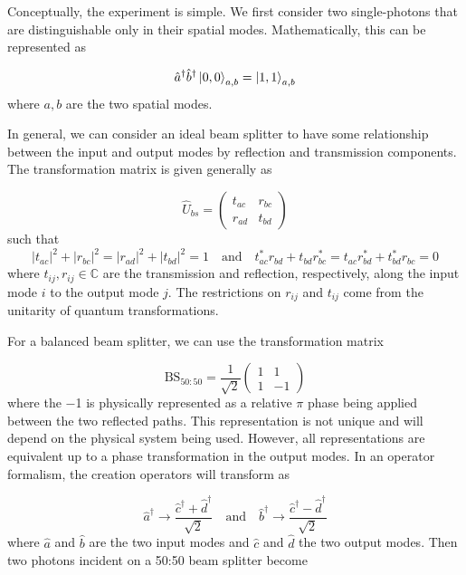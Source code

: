 Conceptually, the experiment is simple. We first consider two single-photons that are distinguishable only in their spatial modes. Mathematically, this can be represented as 

\begin{equation}
	\hat{a}^\dagger \hat{b}^\dagger \ket{0,0}_{a,b} = \ket{1,1}_{a,b}
\end{equation}
where $a,b$ are the two spatial modes.

In general, we can consider an ideal beam splitter to have some relationship between the input and output modes by reflection and transmission components. The transformation matrix is given generally as 

\begin{equation}
	\hat{U}_{bs} = \left(
	\begin{matrix}
		t_{ac} & r_{bc} \\
		r_{ad} & t_{bd}
	\end{matrix}
	\right)
\end{equation}
such that
\begin{equation}
	|t_{ac}|^2 + |r_{bc}|^2 = |r_{ad}|^2 + |t_{bd}|^2 = 1 
	\quad\text{and}\quad
	t_{ac}^\ast r_{bd} + t_{bd} r_{bc}^\ast = t_{ac} r_{bd}^\ast + t_{bd}^\ast  r_{bc} = 0
\end{equation}
where $t_{ij}, r_{ij} \in \mathbb{C}$ are the transmission and reflection, respectively, along the input mode $i$ to the output mode $j$. The restrictions on $r_{ij}$ and $t_{ij}$ come from the unitarity of quantum transformations. 

For a balanced beam splitter,  we can use the transformation matrix

\begin{equation}
	\text{BS}_{50:50} = \frac{1}{\sqrt{2}}
	\left(
	\begin{matrix}
		1 & 1 \\
		1 & -1
	\end{matrix}
	\right)	
\end{equation}
where the \num{-1} is physically represented as a relative $\pi$ phase being applied between the two reflected paths. This representation is not unique and will depend on the physical system being used. However, all representations are equivalent up to a phase transformation in the output modes. In an operator formalism, the creation operators will transform as

\begin{equation}
	\hat{a}^\dagger \rightarrow \frac{\hat{c}^\dagger + \hat{d}^\dagger}{\sqrt{2}} \quad \text{and} \quad \hat{b}^\dagger \rightarrow \frac{\hat{c}^\dagger - \hat{d}^\dagger}{\sqrt{2}}
\end{equation}
where $\hat{a}$ and $\hat{b}$ are the two input modes and $\hat{c}$ and $\hat{d}$ the two output modes. Then two photons incident on a {50:50} beam splitter become

